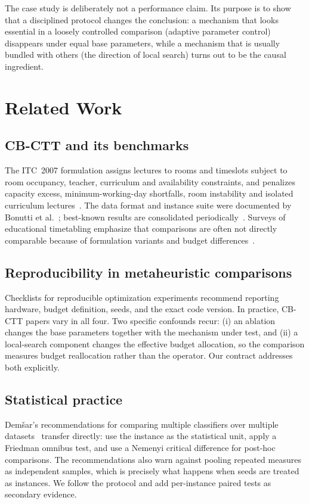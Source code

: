 \documentclass[journal]{IEEEtran}
\begin{document}
The case study is deliberately not a performance claim. Its purpose is to show that a disciplined protocol changes the conclusion: a mechanism that looks essential in a loosely controlled comparison (adaptive parameter control) disappears under equal base parameters, while a mechanism that is usually bundled with others (the direction of local search) turns out to be the causal ingredient.

\section{Related Work}
\subsection{CB-CTT and its benchmarks}
The ITC~2007 formulation assigns lectures to rooms and timeslots subject to room occupancy, teacher, curriculum and availability constraints, and penalizes capacity excess, minimum-working-day shortfalls, room instability and isolated curriculum lectures~\cite{mccollum2009setting}. The data format and instance suite were documented by Bonutti et al.~\cite{bonutti2012benchmarking}; best-known results are consolidated periodically~\cite{ceschia2022educational}. Surveys of educational timetabling emphasize that comparisons are often not directly comparable because of formulation variants and budget differences~\cite{bettinelli2015survey,chen2021survey}.

\subsection{Reproducibility in metaheuristic comparisons}
Checklists for reproducible optimization experiments recommend reporting hardware, budget definition, seeds, and the exact code version. In practice, CB-CTT papers vary in all four. Two specific confounds recur: (i) an ablation changes the base parameters together with the mechanism under test, and (ii) a local-search component changes the effective budget allocation, so the comparison measures budget reallocation rather than the operator. Our contract addresses both explicitly.

\subsection{Statistical practice}
Dem\v{s}ar's recommendations for comparing multiple classifiers over multiple datasets~\cite{demsar2006statistical} transfer directly: use the instance as the statistical unit, apply a Friedman omnibus test, and use a Nemenyi critical difference for post-hoc comparisons. The recommendations also warn against pooling repeated measures as independent samples, which is precisely what happens when seeds are treated as instances. We follow the protocol and add per-instance paired tests as secondary evidence.
\end{document}
